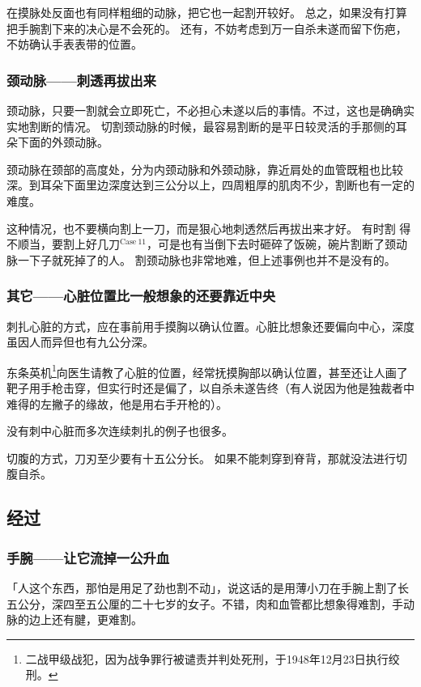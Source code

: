 \documentclass[UTF8]{ctexart}
\begin{document}
在摸脉处反面也有同样粗细的动脉，把它也一起割开较好。
总之，如果没有打算把手腕割下来的决心是不会死的。 
还有，不妨考虑到万一自杀未遂而留下伤疤，不妨确认手表表带的位置。

\subsubsection*{颈动脉——刺透再拔出来}

颈动脉，只要一割就会立即死亡，不必担心未遂以后的事情。不过，这也是确确实实地割断的情况。
切割颈动脉的时候，最容易割断的是平日较灵活的手那侧的耳朵下面的外颈动脉。

颈动脉在颈部的高度处，分为内颈动脉和外颈动脉，靠近肩处的血管既粗也比较深。到耳朵下面里边深度达到三公分以上，四周粗厚的肌肉不少，割断也有一定的难度。

这种情况，也不要横向割上一刀，而是狠心地刺透然后再拔出来才好。
有时割 得不顺当，要割上好几刀$^{\mathrm{Case\ 11}}$，可是也有当倒下去时砸碎了饭碗，碗片割断了颈动 脉一下子就死掉了的人。
割颈动脉也非常地难，但上述事例也并不是没有的。

\subsubsection*{其它——心脏位置比一般想象的还要靠近中央}

刺扎心脏的方式，应在事前用手摸胸以确认位置。心脏比想象还要偏向中心，深度虽因人而异但也有九公分深。

东条英机\footnote{二战甲级战犯，因为战争罪行被谴责并判处死刑，于1948年12月23日执行绞刑。}向医生请教了心脏的位置，经常抚摸胸部以确认位置，甚至还让人画了靶子用手枪击穿，但实行时还是偏了，以自杀未遂告终（有人说因为他是独裁者中难得的左撇子的缘故，他是用右手开枪的）。

没有刺中心脏而多次连续刺扎的例子也很多。

切腹的方式，刀刃至少要有十五公分长。
如果不能刺穿到脊背，那就没法进行切腹自杀。

\subsection{经过}

\subsubsection*{手腕——让它流掉一公升血}

「人这个东西，那怕是用足了劲也割不动」，说这话的是用薄小刀在手腕上割了长五公分，深四至五公厘的二十七岁的女子。不错，肉和血管都比想象得难割，手动脉的边上还有腱，更难割。
\end{document}
